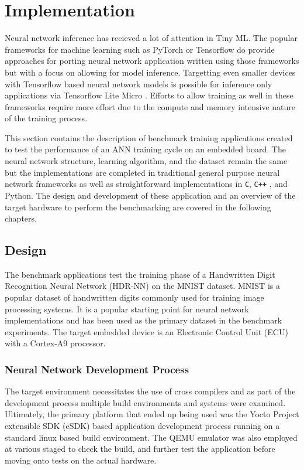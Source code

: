 \part{Implementation}

Neural network inference has recieved a lot of attention in Tiny ML. The popular frameworks for machine learning such as PyTorch or Tensorflow do provide approaches for porting neural network application written using those frameworks but with a focus on allowing for model inference. Targetting even smaller devices with Tensorflow based neural network models is possible for inference only applications via Tensorflow Lite Micro \cite{tflm}. Efforts to allow training as well in these frameworks require more effort due to the compute and memory intensive nature of the training process.

This section contains the description of benchmark training applications created to test the performance of an ANN training cycle on an embedded board. The neural network structure, learning algorithm, and the dataset remain the same but the implementations are completed in traditional general purpose neural network frameworks as well as straightforward implementations in \verb!C!, \verb!C++! , and Python. The design and development of these application and an overview of the target hardware to perform the benchmarking are covered in the following chapters.

\chapter{Design}

The benchmark applications test the training phase of a Handwritten Digit Recognition Neural Network (HDR-NN) on the MNIST \cite{mnist} dataset. MNIST is a popular dataset of handwritten digits commonly used for training image processing systems. It is a popular starting point for neural network implementations and has been used as the primary dataset in the benchmark experiments. The target embedded device is an Electronic Control Unit (ECU) with a Cortex-A9 processor.

\section{Neural Network Development Process}

The target environment necessitates the use of cross compilers and as part of the development process multiple build environments and systems were examined. Ultimately, the primary platform that ended up being used was the Yocto Project extensible SDK (eSDK) based application development process running on a standard linux based build environment. The QEMU emulator was also employed at various staged to check the build, and further test the application before moving onto tests on the actual hardware.

